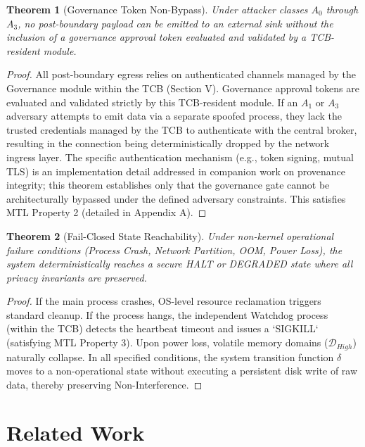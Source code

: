 \documentclass[conference]{IEEEtran}
\newtheorem{theorem}{Theorem}
\begin{document}
\begin{theorem}[Governance Token Non-Bypass]
Under attacker classes $A_0$ through $A_3$, no post-boundary payload can be emitted to an external sink without the inclusion of a governance approval token evaluated and validated by a TCB-resident module.
\end{theorem}
\begin{proof}
All post-boundary egress relies on authenticated channels managed by the Governance module within the TCB (Section V). Governance approval tokens are evaluated and validated strictly by this TCB-resident module. If an $A_1$ or $A_3$ adversary attempts to emit data via a separate spoofed process, they lack the trusted credentials managed by the TCB to authenticate with the central broker, resulting in the connection being deterministically dropped by the network ingress layer. The specific authentication mechanism (e.g., token signing, mutual TLS) is an implementation detail addressed in companion work on provenance integrity; this theorem establishes only that the governance gate cannot be architecturally bypassed under the defined adversary constraints. This satisfies MTL Property 2 (detailed in Appendix A).
\end{proof}

\begin{theorem}[Fail-Closed State Reachability]
Under non-kernel operational failure conditions (Process Crash, Network Partition, OOM, Power Loss), the system deterministically reaches a secure HALT or DEGRADED state where all privacy invariants are preserved.
\end{theorem}
\begin{proof}
If the main process crashes, OS-level resource reclamation triggers standard cleanup. If the process hangs, the independent Watchdog process (within the TCB) detects the heartbeat timeout and issues a `SIGKILL` (satisfying MTL Property 3). Upon power loss, volatile memory domains ($\mathcal{D}_{High}$) naturally collapse. In all specified conditions, the system transition function $\delta$ moves to a non-operational state without executing a persistent disk write of raw data, thereby preserving Non-Interference.
\end{proof}

\section{Related Work}
\end{document}
